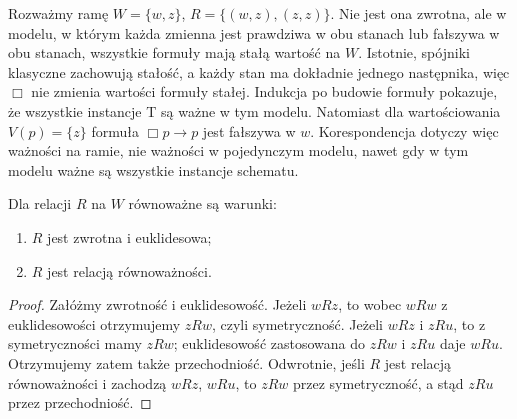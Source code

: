 \begin{przyklad}
\label{ex:ncl-kripke-model-frame-distinction}
Rozważmy ramę $W=\{w,z\}$, $R=\{(w,z),(z,z)\}$.
Nie jest ona zwrotna, ale w modelu, w którym
każda zmienna jest prawdziwa w obu stanach
lub fałszywa w obu stanach, wszystkie formuły
mają stałą wartość na $W$. Istotnie, spójniki
klasyczne zachowują stałość, a każdy stan ma
dokładnie jednego następnika, więc $\Box$
nie zmienia wartości formuły stałej.
Indukcja po budowie formuły pokazuje, że
wszystkie instancje T są ważne w tym modelu.
Natomiast dla wartościowania $V(p)=\{z\}$
formuła $\Box p\to p$ jest fałszywa w $w$.
Korespondencja dotyczy więc ważności na ramie,
nie ważności w pojedynczym modelu, nawet
gdy w tym modelu ważne są wszystkie instancje
schematu.
\end{przyklad}

\begin{lemat}
\label{lem:ncl-kripke-reflexive-euclidean}
Dla relacji $R$ na $W$ równoważne są warunki:
\begin{enumerate}
 \item $R$ jest zwrotna i euklidesowa;
 \item $R$ jest relacją równoważności.
\end{enumerate}
\end{lemat}
\begin{proof}
Załóżmy zwrotność i euklidesowość.
Jeżeli $wRz$, to wobec $wRw$ z euklidesowości
otrzymujemy $zRw$, czyli symetryczność.
Jeżeli $wRz$ i $zRu$, to z symetryczności
mamy $zRw$; euklidesowość zastosowana
do $zRw$ i $zRu$ daje $wRu$.
Otrzymujemy zatem także przechodniość.
Odwrotnie, jeśli $R$ jest relacją równoważności
i zachodzą $wRz$, $wRu$, to $zRw$ przez
symetryczność, a stąd $zRu$ przez przechodniość.
\end{proof}

